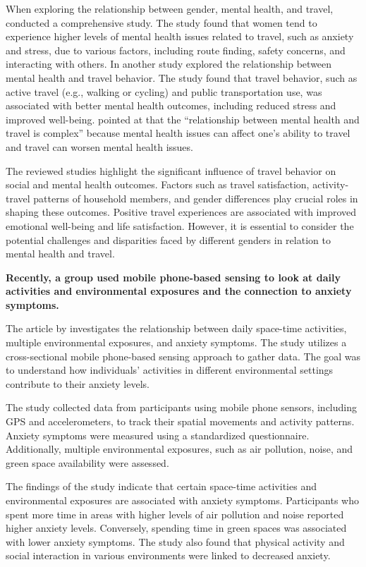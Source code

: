 \documentclass[
  letterpaper,
  authoryear]{elsarticle}
\begin{document}
When exploring the relationship between gender, mental health, and
travel, \citet{mackettGenderMentalHealth2022} conducted a comprehensive
study. The study found that women tend to experience higher levels of
mental health issues related to travel, such as anxiety and stress, due
to various factors, including route finding, safety concerns, and
interacting with others. In another study
\citet{mackettMentalHealthTravel2021} explored the relationship between
mental health and travel behavior. The study found that travel behavior,
such as active travel (e.g., walking or cycling) and public
transportation use, was associated with better mental health outcomes,
including reduced stress and improved well-being.
\citet{mackettMentalHealthTravel2021} pointed at that the ``relationship
between mental health and travel is complex'' because mental health
issues can affect one's ability to travel and travel can worsen mental
health issues.

The reviewed studies highlight the significant influence of travel
behavior on social and mental health outcomes. Factors such as travel
satisfaction, activity-travel patterns of household members, and gender
differences play crucial roles in shaping these outcomes. Positive
travel experiences are associated with improved emotional well-being and
life satisfaction. However, it is essential to consider the potential
challenges and disparities faced by different genders in relation to
mental health and travel.

\textbf{Recently, a group used mobile phone-based sensing to look at
daily activities and environmental exposures and the connection to
anxiety symptoms.}

The article by \citet{lanDailySpacetimeActivities2022} investigates the
relationship between daily space-time activities, multiple environmental
exposures, and anxiety symptoms. The study utilizes a cross-sectional
mobile phone-based sensing approach to gather data. The goal was to
understand how individuals' activities in different environmental
settings contribute to their anxiety levels.

The study collected data from participants using mobile phone sensors,
including GPS and accelerometers, to track their spatial movements and
activity patterns. Anxiety symptoms were measured using a standardized
questionnaire. Additionally, multiple environmental exposures, such as
air pollution, noise, and green space availability were assessed.

The findings of the study indicate that certain space-time activities
and environmental exposures are associated with anxiety symptoms.
Participants who spent more time in areas with higher levels of air
pollution and noise reported higher anxiety levels. Conversely, spending
time in green spaces was associated with lower anxiety symptoms. The
study also found that physical activity and social interaction in
various environments were linked to decreased anxiety.
\end{document}
